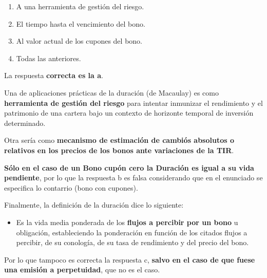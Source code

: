 \documentclass[
  letterpaper,
  DIV=11,
  numbers=noendperiod]{scrreprt}
\providecommand{\tightlist}{%
  \setlength{\itemsep}{0pt}\setlength{\parskip}{0pt}}\usepackage{longtable,booktabs,array}
\begin{document}
\begin{enumerate}
\def\labelenumi{\alph{enumi}.}
\item
  A una herramienta de gestión del riesgo.
\item
  El tiempo hasta el vencimiento del bono.
\item
  Al valor actual de los cupones del bono.
\item
  Todas las anteriores.
\end{enumerate}

\begin{tcolorbox}[enhanced jigsaw, left=2mm, opacityback=0, colback=white, breakable, arc=.35mm, bottomrule=.15mm, rightrule=.15mm, toprule=.15mm, leftrule=.75mm, colframe=quarto-callout-tip-color-frame]
\begin{minipage}[t]{5.5mm}
\textcolor{quarto-callout-tip-color}{\faLightbulb}
\end{minipage}%
\begin{minipage}[t]{\textwidth - 5.5mm}

La respuesta \textbf{correcta es la a}.

Una de aplicaciones prácticas de la duración (de Macaulay) es como
\textbf{herramienta de gestión del riesgo} para intentar inmunizar el
rendimiento y el patrimonio de una cartera bajo un contexto de horizonte
temporal de inversión determinado.

Otra sería como \textbf{mecanismo de estimación de cambiós absolutos o
relativos en los precios de los bonos ante variaciones de la TIR}.

\textbf{Sólo en el caso de un Bono cupón cero la Duración es igual a su
vida pendiente}, por lo que la respuesta b es falsa considerando que en
el enunciado se especifica lo contarrio (bono con cupones).

Finalmente, la definición de la duración dice lo siguiente:

\begin{itemize}
\tightlist
\item
  Es la vida media ponderada de los \textbf{flujos a percibir por un
  bono} u obligación, estableciendo la ponderación en función de los
  citados flujos a percibir, de su conología, de su tasa de rendimiento
  y del precio del bono.
\end{itemize}

Por lo que tampoco es correcta la respuesta c, \textbf{salvo en el caso
de que fuese una emisión a perpetuidad}, que no es el caso.

\end{minipage}%
\end{tcolorbox}
\end{document}
